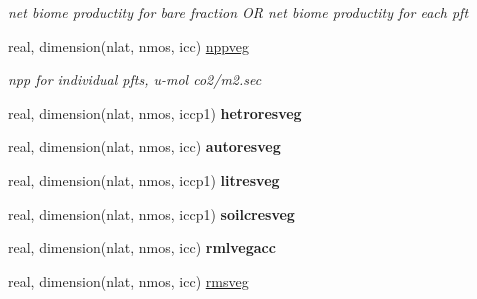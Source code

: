 \begin{DoxyCompactItemize}
\begin{DoxyCompactList}\small\item\em net biome productity for bare fraction O\+R net biome productity for each pft \end{DoxyCompactList}\item 
\hypertarget{structctem__statevars_1_1veg__rot_a9b9ba458a344154b99214635a16d11d3}{}real, dimension(nlat, nmos, icc) \hyperlink{structctem__statevars_1_1veg__rot_a9b9ba458a344154b99214635a16d11d3}{nppveg}\label{structctem__statevars_1_1veg__rot_a9b9ba458a344154b99214635a16d11d3}

\begin{DoxyCompactList}\small\item\em npp for individual pfts, u-\/mol co2/m2.\+sec \end{DoxyCompactList}\item 
\hypertarget{structctem__statevars_1_1veg__rot_a6fa2fd71c16c05ee48ae5e37446923bd}{}real, dimension(nlat, nmos, iccp1) {\bfseries hetroresveg}\label{structctem__statevars_1_1veg__rot_a6fa2fd71c16c05ee48ae5e37446923bd}

\item 
\hypertarget{structctem__statevars_1_1veg__rot_a3782464dd26cb59d86d1c13fea0d718e}{}real, dimension(nlat, nmos, icc) {\bfseries autoresveg}\label{structctem__statevars_1_1veg__rot_a3782464dd26cb59d86d1c13fea0d718e}

\item 
\hypertarget{structctem__statevars_1_1veg__rot_ad6c34130b59e872fe399531a3e20aff0}{}real, dimension(nlat, nmos, iccp1) {\bfseries litresveg}\label{structctem__statevars_1_1veg__rot_ad6c34130b59e872fe399531a3e20aff0}

\item 
\hypertarget{structctem__statevars_1_1veg__rot_a42c55a07665781b2eb1e7d1732361502}{}real, dimension(nlat, nmos, iccp1) {\bfseries soilcresveg}\label{structctem__statevars_1_1veg__rot_a42c55a07665781b2eb1e7d1732361502}

\item 
\hypertarget{structctem__statevars_1_1veg__rot_a2aa123e9e53c40f7b4e0def95436b98d}{}real, dimension(nlat, nmos, icc) {\bfseries rmlvegacc}\label{structctem__statevars_1_1veg__rot_a2aa123e9e53c40f7b4e0def95436b98d}

\item 
\hypertarget{structctem__statevars_1_1veg__rot_a4b4e07683152a7cf02d3e2d7a7faf8fc}{}real, dimension(nlat, nmos, icc) \hyperlink{structctem__statevars_1_1veg__rot_a4b4e07683152a7cf02d3e2d7a7faf8fc}{rmsveg}\label{structctem__statevars_1_1veg__rot_a4b4e07683152a7cf02d3e2d7a7faf8fc}


\end{DoxyCompactItemize}
